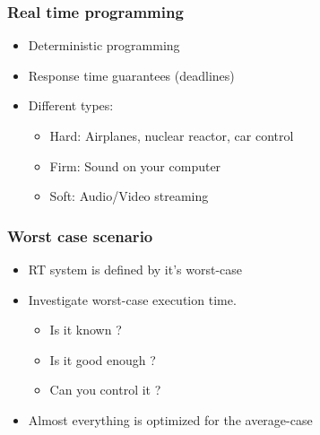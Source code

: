 \begin{frame}
  \frametitle{Real time programming}

  \begin{itemize}
  \item Deterministic programming
  \item Response time guarantees (deadlines)
  \item Different types:
    \begin{itemize}
    \item Hard: Airplanes, nuclear reactor, car control
    \item Firm: Sound on your computer
    \item Soft: Audio/Video streaming
    \end{itemize}
  \end{itemize}
\end{frame}


\begin{frame}
  \frametitle{Worst case scenario}

  \begin{itemize}
  \item RT system is defined by it's worst-case
  \item Investigate worst-case execution time.
    \begin{itemize}
    \item Is it known ?
    \item Is it good enough ?
    \item Can you control it ?
    \end{itemize}
  \item Almost everything is optimized for the average-case
  \end{itemize}
\end{frame}


